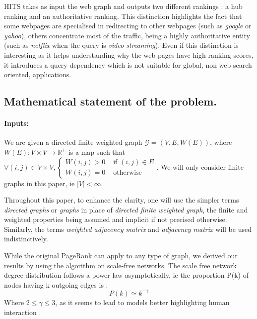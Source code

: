 \documentclass[sn-mathphys]{sn-jnl}%
\theoremstyle{thmstyleone}%
\theoremstyle{thmstyletwo}%
\theoremstyle{thmstylethree}%
\begin{document}
HITS takes as input the web graph and outputs two different rankings :
a hub ranking and an authoritative ranking. This distinction
highlights the fact that some webpages are specialised in redirecting
to other webpages (such as \textit{google} or \textit{yahoo}), others
concentrate most of the traffic, being a highly authoritative entity
(such as \textit{netflix} when the query is \textit{video
  streaming}). Even if this distinction is interesting as it helps
understanding why the web pages have high ranking scores, it
introduces a query dependency which is not suitable for global, non
web search oriented, applications.


\subsection{Mathematical statement of the problem.}

\paragraph{Inputs:} We are given a directed finite weighted graph $\mathcal{G} = (V, E, W(E))$, where
$W(E) : V \times V \rightarrow \mathbb{R}^{+}$ is a map such that $\forall (i,j) \in V\times V, \left\{ \begin{array}{cc}
    W(i,j)>0 & \mbox{ if } (i,j) \in E  \\
    W(i,j)=0 & \mbox{ otherwise}
\end{array} \right.$.
We will only consider finite graphs in this paper, ie $|V|<\infty$.

Throughout this paper, to enhance the clarity, one will use the
simpler terms \textit{directed graphs} or \textit{graphs} in place of
\textit{directed finite weighted graph}, the finite and weighted
properties being assumed and implicit if not precised
otherwise. Similarly, the terms \textit{weighted adjacency matrix} and
\textit{adjacency matrix} will be used indistinctively.

While the original PageRank can apply to any type of graph, we derived
our results by using the algorithm on scale-free networks. The scale
free network degree distribution follows a power law asymptotically,
ie the proportion P(k) of nodes having k outgoing edges is :
\begin{equation*}
    P(k) \simeq k^{-\gamma}
\end{equation*}
Where $2 \leq \gamma \leq 3$, as it seems to lead to models better
highlighting human interaction \cite{choromanski_matuszak_mie}.
\end{document}
